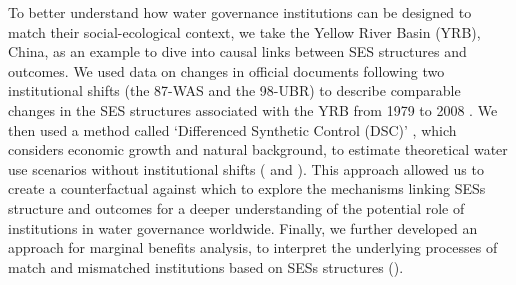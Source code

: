 To better understand how water governance institutions can be designed to match their social-ecological context, we take the Yellow River Basin (YRB), China, as an example \textit{} to dive into causal links between SES structures and outcomes.
We used data on changes in official documents following two institutional shifts (the 87-WAS and the 98-UBR) to describe comparable changes in the SES structures associated with the YRB from 1979 to 2008 \textit{}.
We then used a method called `Differenced Synthetic Control (DSC)' \cite{arkhangelsky2021}, which considers economic growth and natural background, to estimate theoretical water use scenarios without institutional shifts (\textit{} and \textit{}).
This approach allowed us to create a counterfactual against which to explore the mechanisms linking SESs structure and outcomes for a deeper understanding of the potential role of institutions in water governance worldwide.
Finally, we further developed an approach for marginal benefits analysis, to interpret the underlying processes of match and mismatched institutions based on SESs structures (\textit{}).
